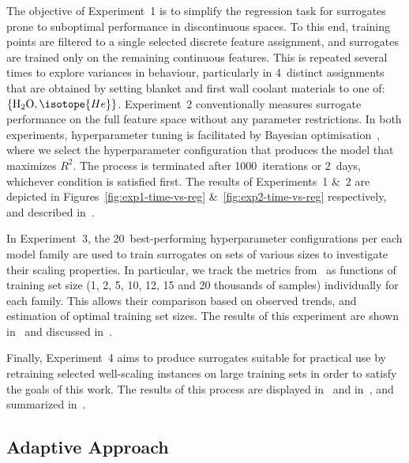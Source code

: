 The objective of Experiment~1 is to simplify the regression task for
surrogates prone to suboptimal performance in discontinuous spaces.
To this end, training points are filtered to a single selected discrete feature
assignment, and surrogates are trained only on the remaining continuous features.
This is repeated several times to explore variances in behaviour,
particularly in 4~distinct assignments that are obtained by setting blanket and
first wall coolant materials to one
of:~$\{\text{H\textsubscript{2}O},\isotope{He}\}$.
Experiment~2 conventionally measures surrogate performance on the full feature
space without any parameter restrictions. In both experiments, hyperparameter tuning is
facilitated by Bayesian optimisation~\cite{movckus1975bayesian}, where we select the
hyperparameter configuration that produces the model that maximizes $R^2$. The
process is terminated after 1000~iterations or 2~days, whichever condition is satisfied first.
The results of Experiments~1 \&~2 are depicted
in Figures~\ref{fig:exp1-time-vs-reg} \&~\ref{fig:exp2-time-vs-reg}
respectively, and described in~.

In Experiment~3, the 20~best-performing hyperparameter configurations
per each model family are used to train surrogates on sets of various sizes to
investigate their scaling properties. In particular, we track the metrics
from~ as functions of training set size (1, 2, 5, 10, 12, 15 and 20 thousands
of samples) individually for each family. This allows their comparison based on
observed trends, and estimation of optimal training set sizes.
The results of this experiment are shown in~ and discussed
in~.

Finally, Experiment~4 aims
to produce surrogates suitable for practical use by retraining selected
well-scaling instances on large training sets in order to satisfy the goals of this work.
The results of this process are displayed in~ and
in~, and summarized in~.


\subsection{Adaptive Approach}\label{sec:adaptive}

